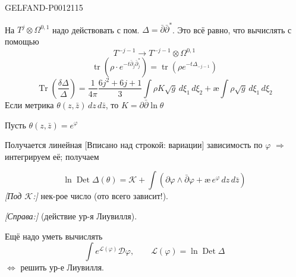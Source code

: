 \begin{GelfandAdjacentEvidence}{GELFAND-P001211}{5}


На \(T^j\otimes\Omega^{0,1}\) надо действовать с пом. \(\Delta=\bar\partial\bar\partial^*\).
Это всё равно, что вычислять с помощью
\[
T^{-j-1}\longrightarrow T^{-j-1}\otimes\Omega^{0,1}
\]
\[
\operatorname{tr}(\rho\cdot e^{-t\bar\partial_j\bar\partial_j^*})
=\operatorname{tr}(\rho e^{-t\Delta_{-j-1}})
\]
\[
\operatorname{Tr}\left(\frac{\delta\Delta}{\Delta}\right)
=\frac1{4\pi}\frac{6j^2+6j+1}{3}
\int\rho K\sqrt g\,d\xi_1\,d\xi_2
+\text{\ae}\int\rho\sqrt g\,d\xi_1\,d\xi_2
\]
Если метрика \(\theta(z,\bar z)\,dz\,d\bar z\), то \(K=\partial\bar\partial\ln\theta\)

Пусть \(\theta(z,\bar z)=e^\varphi\)

Получается линейная [Вписано над строкой: вариации] зависимость по \(\varphi\)
\(\Rightarrow\) интегрируем её; получаем
\end{GelfandAdjacentEvidence}

\[
\ln\operatorname{Det}\Delta(\theta)=\mathcal K+
\int\left(\partial\varphi\wedge\bar\partial\varphi+\text{\ae}\,e^\varphi\,dz\,d\bar z\right)
\]
\textit{[Под \(\mathcal K\):]} нек-рое число (ото всего зависит!).

\textit{[Справа:]} (действие ур-я Лиувилля).

Ещё надо уметь вычислять
\[
\int e^{\mathcal L(\varphi)}\mathcal D\varphi,\qquad
\mathcal L(\varphi)=\ln\operatorname{Det}\Delta
\]
\(\Leftrightarrow\) решить ур-е Лиувилля.


